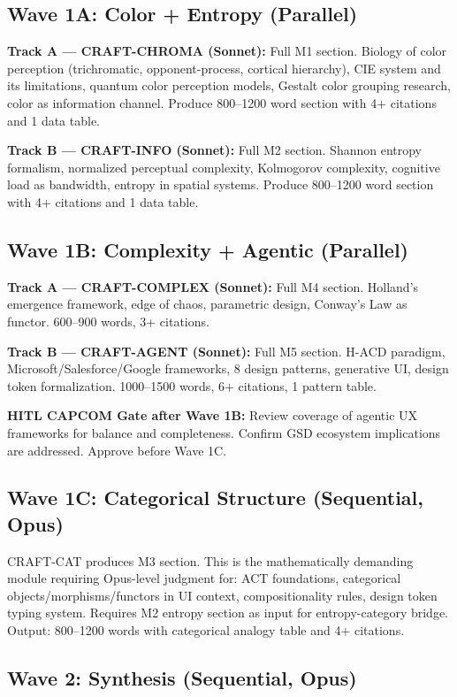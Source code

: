 \documentclass[11pt,letterpaper]{article}
\begin{document}
\subsection{Wave 1A: Color + Entropy (Parallel)}

\textbf{Track A --- CRAFT-CHROMA (Sonnet):} Full M1 section. Biology of color perception (trichromatic, opponent-process, cortical hierarchy), CIE system and its limitations, quantum color perception models, Gestalt color grouping research, color as information channel. Produce 800--1200 word section with 4+ citations and 1 data table.

\textbf{Track B --- CRAFT-INFO (Sonnet):} Full M2 section. Shannon entropy formalism, normalized perceptual complexity, Kolmogorov complexity, cognitive load as bandwidth, entropy in spatial systems. Produce 800--1200 word section with 4+ citations and 1 data table.

\subsection{Wave 1B: Complexity + Agentic (Parallel)}

\textbf{Track A --- CRAFT-COMPLEX (Sonnet):} Full M4 section. Holland's emergence framework, edge of chaos, parametric design, Conway's Law as functor. 600--900 words, 3+ citations.

\textbf{Track B --- CRAFT-AGENT (Sonnet):} Full M5 section. H-ACD paradigm, Microsoft/Salesforce/Google frameworks, 8 design patterns, generative UI, design token formalization. 1000--1500 words, 6+ citations, 1 pattern table.

\textbf{HITL CAPCOM Gate after Wave 1B:} Review coverage of agentic UX frameworks for balance and completeness. Confirm GSD ecosystem implications are addressed. Approve before Wave 1C.

\subsection{Wave 1C: Categorical Structure (Sequential, Opus)}

CRAFT-CAT produces M3 section. This is the mathematically demanding module requiring Opus-level judgment for: ACT foundations, categorical objects/morphisms/functors in UI context, compositionality rules, design token typing system. Requires M2 entropy section as input for entropy-category bridge. Output: 800--1200 words with categorical analogy table and 4+ citations.

\subsection{Wave 2: Synthesis (Sequential, Opus)}
\end{document}
